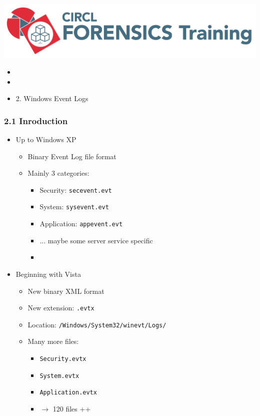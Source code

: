 %
%



\begin{frame}
    \includegraphics[scale=.3]{images/logo-circl-Forensics.png}
    \begin{itemize}
        \item[]
        \item[]
        \item[] 2. Windows Event Logs
    \end{itemize}
\end{frame}


\begin{frame}[fragile]
  \frametitle{2.1 Inroduction}
    \begin{itemize}
        \item Up to Windows XP
            \begin{itemize}
                \item Binary Event Log file format
                \item Mainly 3 categories:
                \begin{itemize}
			\item[] Security:  \texttt{secevent.evt}
			\item[] System:  \texttt{sysevent.evt}
			\item[] Application:  \texttt{appevent.evt}
			\item[] ... maybe some server service specific
			\item[]
                \end{itemize}
            \end{itemize}
        \item Beginning with Vista
            \begin{itemize}
                \item New binary XML format
		\item New extension: \texttt{.evtx}
		\item Location: \texttt{/Windows/System32/winevt/Logs/}
                \item Many more files:
                \begin{itemize}
			\item[] \texttt{Security.evtx}
			\item[] \texttt{System.evtx}
			\item[] \texttt{Application.evtx}
			\item[] $\to$ 120 files ++
                \end{itemize}
            \end{itemize}
    \end{itemize}
\end{frame}


